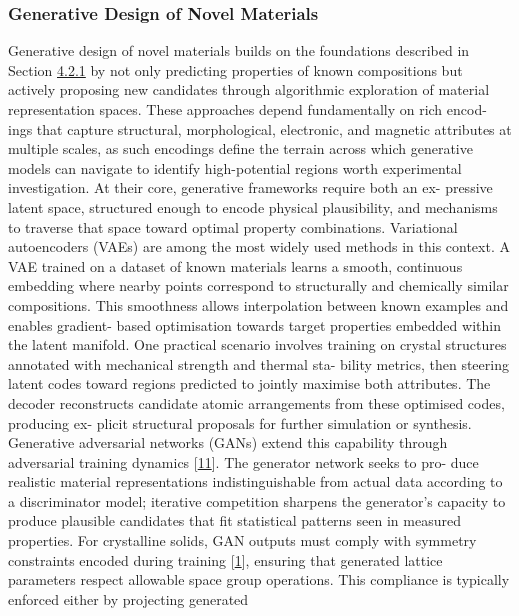 \documentclass[
]{article}
\begin{document}
\subsubsection{Generative Design of Novel
Materials}\label{generative-design-of-novel-materials}

Generative design of novel materials builds on the foundations described
in Section
\hyperref[predictive-modelling-of-material-performance]{4.2.1} by not
only predicting properties of known compositions but actively proposing
new candidates through algorithmic exploration of material
representation spaces. These approaches depend fundamentally on rich
encod- ings that capture structural, morphological, electronic, and
magnetic attributes at multiple scales, as such encodings define the
terrain across which generative models can navigate to identify
high-potential regions worth experimental investigation. At their core,
generative frameworks require both an ex- pressive latent space,
structured enough to encode physical plausibility, and mechanisms to
traverse that space toward optimal property combinations. Variational
autoencoders (VAEs) are among the most widely used methods in this
context. A VAE trained on a dataset of known materials learns a smooth,
continuous embedding where nearby points correspond to structurally and
chemically similar compositions. This smoothness allows interpolation
between known examples and enables gradient- based optimisation towards
target properties embedded within the latent manifold. One practical
scenario involves training on crystal structures annotated with
mechanical strength and thermal sta- bility metrics, then steering
latent codes toward regions predicted to jointly maximise both
attributes. The decoder reconstructs candidate atomic arrangements from
these optimised codes, producing ex- plicit structural proposals for
further simulation or synthesis. Generative adversarial networks (GANs)
extend this capability through adversarial training dynamics
{[}\hyperref[_bookmark51]{11}{]}. The generator network seeks to pro-
duce realistic material representations indistinguishable from actual
data according to a discriminator model; iterative competition sharpens
the generator's capacity to produce plausible candidates that fit
statistical patterns seen in measured properties. For crystalline
solids, GAN outputs must comply with symmetry constraints encoded during
training {[}\hyperref[_bookmark41]{1}{]}, ensuring that generated
lattice parameters respect allowable space group operations. This
compliance is typically enforced either by projecting generated
\end{document}

